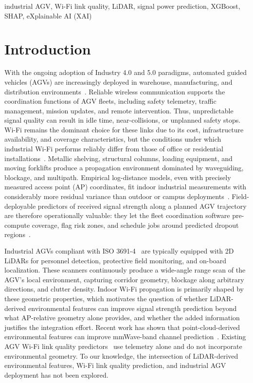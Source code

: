 \documentclass[conference]{IEEEtran}
\begin{document}
\begin{IEEEkeywords}
industrial AGV, Wi\nobreakdash-Fi link quality, LiDAR, signal power prediction, XGBoost, SHAP, eXplainable AI (XAI)
\end{IEEEkeywords}


\section{Introduction}
\label{sec:intro}

With the ongoing adoption of Industry 4.0 and 5.0 paradigms, automated guided vehicles (AGVs) are increasingly deployed in warehouse, manufacturing, and distribution environments~\cite{fragapane2021planning}. Reliable wireless communication supports the coordination functions of AGV fleets, including safety telemetry, traffic management, mission updates, and remote intervention. Thus, unpredictable signal quality can result in idle time, near-collisions, or unplanned safety stops. Wi\nobreakdash-Fi remains the dominant choice for these links due to its cost, infrastructure availability, and coverage characteristics, but the conditions under which industrial Wi\nobreakdash-Fi performs reliably differ from those of office or residential installations~\cite{cena2025wifi,schmieder2023agvdatasets}. Metallic shelving, structural columns, loading equipment, and moving forklifts produce a propagation environment dominated by waveguiding, blockage, and multipath. Empirical log-distance models, even with precisely measured access point (AP) coordinates, fit indoor industrial measurements with considerably more residual variance than outdoor or campus deployments~\cite{cena2025wifi,formis2025wifi}. Field-deployable predictors of received signal strength along a planned AGV trajectory are therefore operationally valuable: they let the fleet coordination software pre-compute coverage, flag risk zones, and schedule jobs around predicted dropout regions~\cite{gulia2025evowisva}.
 
Industrial AGVs compliant with ISO 3691-4~\cite{iso3691-4} are typically equipped with 2D LiDARs for personnel detection, protective field monitoring, and on-board localization. These scanners continuously produce a wide-angle range scan of the AGV's local environment, capturing corridor geometry, blockage along arbitrary directions, and clutter density. Indoor Wi\nobreakdash-Fi propagation is primarily shaped by these geometric properties, which motivates the question of whether LiDAR-derived environmental features can improve signal strength prediction beyond what AP-relative geometry alone provides, and whether the added information justifies the integration effort. Recent work has shown that point-cloud-derived environmental features can improve mmWave-band channel prediction~\cite{ohta2023pointcloud,nist2024mmwave,zhang2025mmlscm,clark2022propeml}. Existing AGV Wi\nobreakdash-Fi link quality predictors~\cite{formis2025wifi,formis2024deep,colletto2023ann} use telemetry alone and do not incorporate environmental geometry. To our knowledge, the intersection of LiDAR-derived environmental features, Wi\nobreakdash-Fi link quality prediction, and industrial AGV deployment has not been explored.
 
\end{document}
